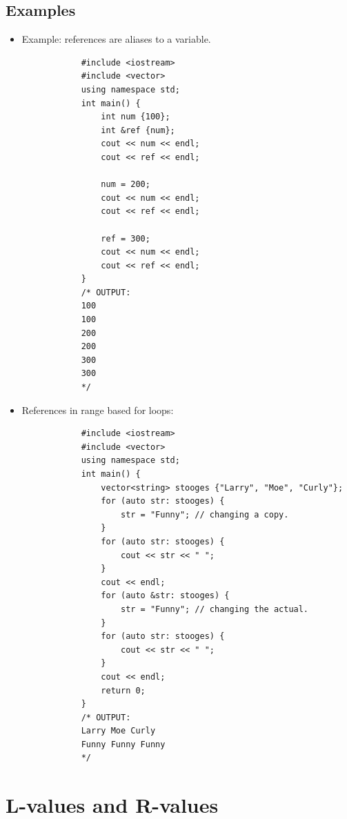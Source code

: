 \subsection{Examples}
\begin{itemize}
    \item Example: references are aliases to a variable.
        \begin{verbatim}
            #include <iostream>
            #include <vector>
            using namespace std;
            int main() {
                int num {100};
                int &ref {num};
                cout << num << endl;
                cout << ref << endl;

                num = 200;
                cout << num << endl;
                cout << ref << endl;

                ref = 300;
                cout << num << endl;
                cout << ref << endl;
            }
            /* OUTPUT:
            100
            100
            200
            200
            300
            300
            */
        \end{verbatim}
    
    \item References in range based for loops:
        \begin{verbatim}
            #include <iostream>
            #include <vector>
            using namespace std;
            int main() {
                vector<string> stooges {"Larry", "Moe", "Curly"};
                for (auto str: stooges) {
                    str = "Funny"; // changing a copy.
                }
                for (auto str: stooges) {
                    cout << str << " ";
                } 
                cout << endl;
                for (auto &str: stooges) {
                    str = "Funny"; // changing the actual.
                }
                for (auto str: stooges) {
                    cout << str << " ";
                }
                cout << endl;
                return 0;
            }
            /* OUTPUT:
            Larry Moe Curly
            Funny Funny Funny
            */
        \end{verbatim}
\end{itemize}


\section{L-values and R-values}
